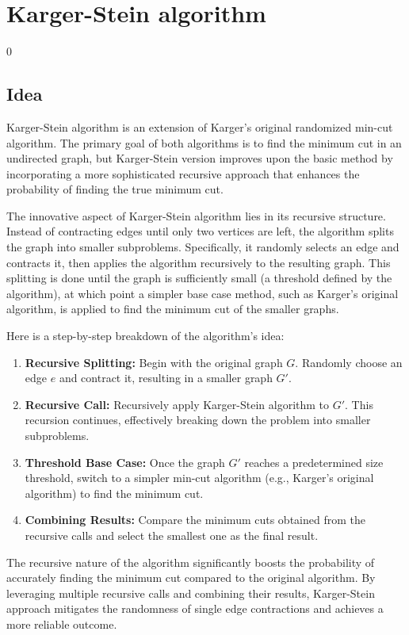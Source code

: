 \section{Karger-Stein algorithm}0
\label{sec:kargerStein}

    \subsection{Idea}
    Karger-Stein algorithm is an extension of Karger's original randomized min-cut algorithm. The primary goal of both algorithms is to find the minimum cut in an undirected graph, but Karger-Stein version improves upon the basic method by incorporating a more sophisticated recursive approach that enhances the probability of finding the true minimum cut.

    The innovative aspect of Karger-Stein algorithm lies in its recursive structure. Instead of contracting edges until only two vertices are left, the algorithm splits the graph into smaller subproblems. Specifically, it randomly selects an edge and contracts it, then applies the algorithm recursively to the resulting graph. This splitting is done until the graph is sufficiently small (a threshold defined by the algorithm), at which point a simpler base case method, such as Karger's original algorithm, is applied to find the minimum cut of the smaller graphs.

    Here is a step-by-step breakdown of the algorithm's idea:
    \begin{enumerate}
        \item \textbf{Recursive Splitting:} Begin with the original graph \( G \). Randomly choose an edge \( e \) and contract it, resulting in a smaller graph \( G' \).
        \item \textbf{Recursive Call:} Recursively apply Karger-Stein algorithm to \( G' \). This recursion continues, effectively breaking down the problem into smaller subproblems.
        \item \textbf{Threshold Base Case:} Once the graph \( G' \) reaches a predetermined size threshold, switch to a simpler min-cut algorithm (e.g., Karger's original algorithm) to find the minimum cut.
        \item \textbf{Combining Results:} Compare the minimum cuts obtained from the recursive calls and select the smallest one as the final result.
    \end{enumerate}

    The recursive nature of the algorithm significantly boosts the probability of accurately finding the minimum cut compared to the original algorithm. By leveraging multiple recursive calls and combining their results, Karger-Stein approach mitigates the randomness of single edge contractions and achieves a more reliable outcome.

